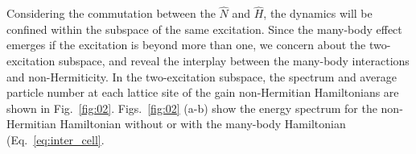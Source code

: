 \documentclass[longbibliography, aps, prx, amsmath, amssymb, amsfonts, twocolumn,superscriptaddress, footinbib]{revtex4-1}
\begin{document}
	
	Considering the commutation between the $\hat{N}$ and $\hat{H}$, the dynamics will be confined within the subspace of the same excitation. Since the many-body effect emerges if the excitation is beyond more than one, we concern about the two-excitation subspace, and reveal the interplay between the many-body interactions and non-Hermiticity. 
	In the two-excitation subspace, the spectrum and average particle number at each lattice site of the gain non-Hermitian Hamiltonians 
	are shown in Fig.~\ref{fig:02}.
	Figs.~\ref{fig:02} (a-b) show the energy spectrum
	for the non-Hermitian Hamiltonian without or with the many-body Hamiltonian (Eq.~\ref{eq:inter_cell}. 
\end{document}
